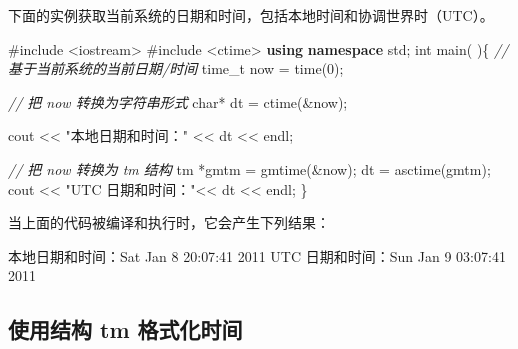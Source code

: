 \documentclass[
]{article}
\newenvironment{Shaded}{}{}
\newcommand{\BaseNTok}[1]{\textcolor[rgb]{0.25,0.63,0.44}{#1}}
\newcommand{\CommentTok}[1]{\textcolor[rgb]{0.38,0.63,0.69}{\textit{#1}}}
\newcommand{\DataTypeTok}[1]{\textcolor[rgb]{0.56,0.13,0.00}{#1}}
\newcommand{\DecValTok}[1]{\textcolor[rgb]{0.25,0.63,0.44}{#1}}
\newcommand{\ImportTok}[1]{#1}
\newcommand{\KeywordTok}[1]{\textcolor[rgb]{0.00,0.44,0.13}{\textbf{#1}}}
\newcommand{\NormalTok}[1]{#1}
\newcommand{\OperatorTok}[1]{\textcolor[rgb]{0.40,0.40,0.40}{#1}}
\newcommand{\PreprocessorTok}[1]{\textcolor[rgb]{0.74,0.48,0.00}{#1}}
\newcommand{\StringTok}[1]{\textcolor[rgb]{0.25,0.44,0.63}{#1}}
\begin{document}
下面的实例获取当前系统的日期和时间，包括本地时间和协调世界时（UTC）。

\begin{Shaded}
\begin{Highlighting}[]
\PreprocessorTok{\#include }\ImportTok{\textless{}iostream\textgreater{}}
\PreprocessorTok{\#include }\ImportTok{\textless{}ctime\textgreater{}}
\KeywordTok{using} \KeywordTok{namespace}\NormalTok{ std}\OperatorTok{;}
\DataTypeTok{int}\NormalTok{ main}\OperatorTok{(} \OperatorTok{)\{}
   \CommentTok{// 基于当前系统的当前日期/时间}
   \DataTypeTok{time\_t}\NormalTok{ now }\OperatorTok{=}\NormalTok{ time}\OperatorTok{(}\DecValTok{0}\OperatorTok{);}
   
   \CommentTok{// 把 now 转换为字符串形式}
   \DataTypeTok{char}\OperatorTok{*}\NormalTok{ dt }\OperatorTok{=}\NormalTok{ ctime}\OperatorTok{(\&}\NormalTok{now}\OperatorTok{);}

\NormalTok{   cout }\OperatorTok{\textless{}\textless{}} \StringTok{"本地日期和时间："} \OperatorTok{\textless{}\textless{}}\NormalTok{ dt }\OperatorTok{\textless{}\textless{}}\NormalTok{ endl}\OperatorTok{;}

   \CommentTok{// 把 now 转换为 tm 结构}
\NormalTok{   tm }\OperatorTok{*}\NormalTok{gmtm }\OperatorTok{=}\NormalTok{ gmtime}\OperatorTok{(\&}\NormalTok{now}\OperatorTok{);}
\NormalTok{   dt }\OperatorTok{=}\NormalTok{ asctime}\OperatorTok{(}\NormalTok{gmtm}\OperatorTok{);}
\NormalTok{   cout }\OperatorTok{\textless{}\textless{}} \StringTok{"UTC 日期和时间："}\OperatorTok{\textless{}\textless{}}\NormalTok{ dt }\OperatorTok{\textless{}\textless{}}\NormalTok{ endl}\OperatorTok{;}
\OperatorTok{\}}
\end{Highlighting}
\end{Shaded}

当上面的代码被编译和执行时，它会产生下列结果：

\begin{Shaded}
\begin{Highlighting}[]
\NormalTok{本地日期和时间：Sat Jan  }\DecValTok{8} \DecValTok{20}\OperatorTok{:}\BaseNTok{07}\OperatorTok{:}\DecValTok{41} \DecValTok{2011}
\NormalTok{UTC 日期和时间：Sun Jan  }\DecValTok{9} \BaseNTok{03}\OperatorTok{:}\BaseNTok{07}\OperatorTok{:}\DecValTok{41} \DecValTok{2011}
\end{Highlighting}
\end{Shaded}

\hypertarget{ux4f7fux7528ux7ed3ux6784-tm-ux683cux5f0fux5316ux65f6ux95f4}{%
\subsection{使用结构 tm
格式化时间}\label{ux4f7fux7528ux7ed3ux6784-tm-ux683cux5f0fux5316ux65f6ux95f4}}
\end{document}
